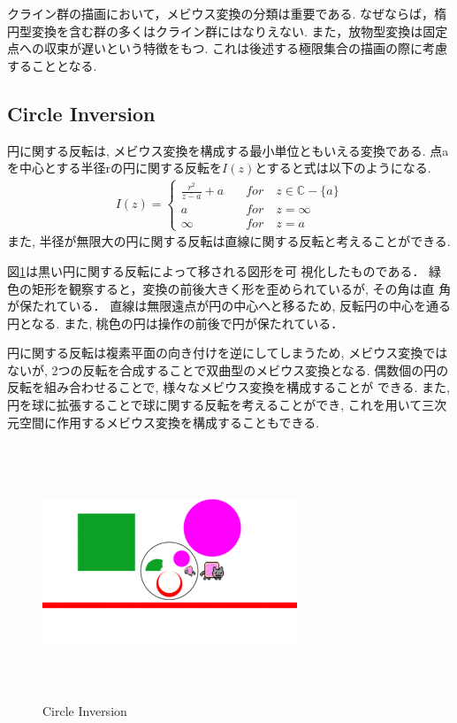 クライン群の描画において，メビウス変換の分類は重要である.
なぜならば，楕円型変換を含む群の多くはクライン群にはなりえない.
また，放物型変換は固定点への収束が遅いという特徴をもつ.
これは後述する極限集合の描画の際に考慮することとなる.

\subsection{Circle Inversion}

円に関する反転は, メビウス変換を構成する最小単位ともいえる変換である.
点aを中心とする半径rの円に関する反転を$I(z)$とすると式は以下のようになる.
\begin{align*}
I(z) =
 \begin{cases}
  \frac{r^2}{\overline{z - a}} + a \quad &for \quad z \in \mathbb{C} - \{a\} \\
  a \quad &for \quad z = \infty\\
  \infty \quad &for \quad z = a
 \end{cases}
\end{align*}
また, 半径が無限大の円に関する反転は直線に関する反転と考えることができる.

図\ref{fig:circleInversion}は黒い円に関する反転によって移される図形を可
視化したものである．
緑色の矩形を観察すると，変換の前後大きく形を歪められているが, その角は直
角が保たれている．
直線は無限遠点が円の中心へと移るため, 反転円の中心を通る円となる.
また, 桃色の円は操作の前後で円が保たれている．

円に関する反転は複素平面の向き付けを逆にしてしまうため, メビウス変換では
ないが, 2つの反転を合成することで双曲型のメビウス変換となる.
偶数個の円の反転を組み合わせることで, 様々なメビウス変換を構成することが
できる.
また, 円を球に拡張することで球に関する反転を考えることができ,
これを用いて三次元空間に作用するメビウス変換を構成することもできる.

\begin{figure}[htbp]
 \begin{center}
      \includegraphics[width=3in, height=3in, keepaspectratio]{../img/klein/circleInversion.pdf}
    \caption{Circle Inversion}
    \label{fig:circleInversion}
 \end{center}
\end{figure}

